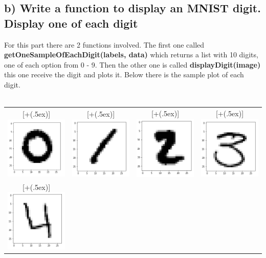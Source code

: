 \documentclass[11pt,letterpaper]{article}
\newcommand*{\addheight}[2][.5ex]{%
  \raisebox{0pt}[\dimexpr\height+(#1)\relax]{#2}%
}
\begin{document}
\subsection{b) Write a function to display an MNIST digit. Display one of each digit}
For this part there are 2 functions involved. The first one called \textbf{getOneSampleOfEachDigit(labels, data)} which returns a list with 10 digits, one of each option from 0 - 9. Then the other one is called \textbf{displayDigit(image)} this one receive the digit and plots it. Below there is the sample plot of each digit.
\\\\
\begin{tabular}{|c|c|c|c|}
      \hline
      \addheight{\includegraphics[width=30mm]{img/1-b/0.png}} &
      \addheight{\includegraphics[width=30mm]{img/1-b/1.png}} &
      \addheight{\includegraphics[width=30mm]{img/1-b/2.png}} &
      \addheight{\includegraphics[width=30mm]{img/1-b/3.png}} \\
      \addheight{\includegraphics[width=30mm]{img/1-b/4.png}} &

\end{tabular}
\end{document}

